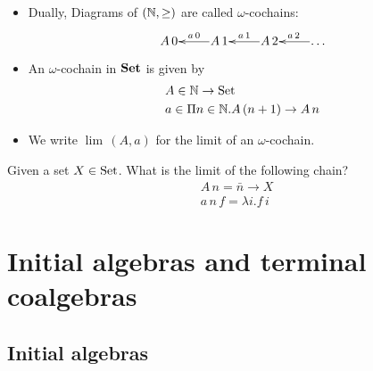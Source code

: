 \documentclass[handout]{beamer}
\begin{document}
\begin{frame}{}
  \begin{itemize}
  \item Dually, Diagrams of $(\mathbb{N},\geq)$ are called $\omega$-cochains:
    \[ \xymatrix@1{ A\,0 & A\,1 \ar[l]_{a\,0} & A\,2 \ar[l]_{a\,1} & \dots \ar[l]_{a\,2} }\]
 
  \item An $\omega$-cochain in $\mathbf{Set}$ is given by
    \begin{align*}
      & A \in \mathbb{N} \to \mathrm{Set} \\
      & a \in \Pi n\in\mathbb{N}.A\,(n+1) \to A\,n
    \end{align*}
    
  \item We write $\lim\,(A,a)$ for the limit of an $\omega$-cochain.

  \end{itemize}

  \begin{exercise}
    Given a set $X\in\mathrm{Set}$. What is the limit of the following chain?
    \begin{align*}
      & A\, n = \bar{n}\to  X\\
      & a\,n\,f = \lambda i.f\,i
    \end{align*}
  \end{exercise}

\end{frame}

\section{Initial algebras and terminal coalgebras}

\subsection{Initial algebras}
\end{document}
